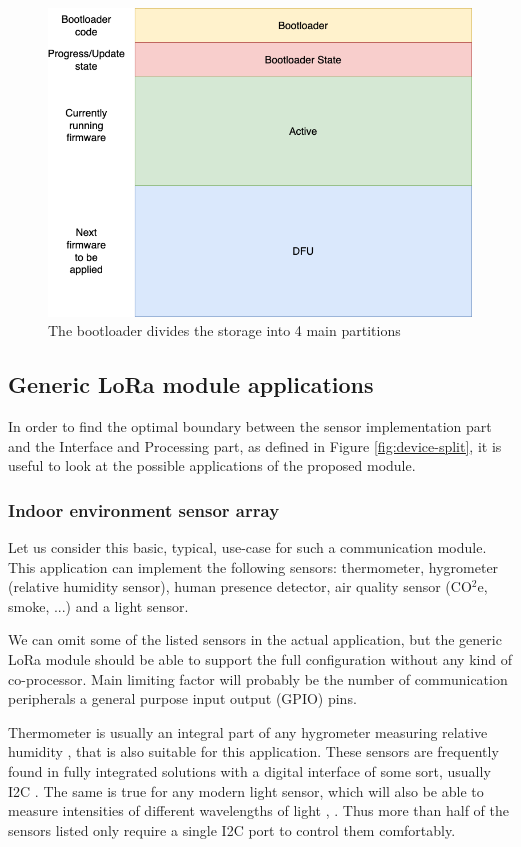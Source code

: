 \begin{figure}
    \includegraphics[width=.6\textwidth]{fig/bootloader_flash.png}
    \caption{\label{fig:bootloader-flash}The bootloader divides the storage into 4 main partitions}
\end{figure}

\subsection{\label{section:application-case-studies}Generic LoRa module applications}
In order to find the optimal boundary between the sensor implementation part and the Interface and Processing part, as defined in Figure \ref{fig:device-split}, it is useful to look at the possible applications of the proposed module.

\subsubsection{Indoor environment sensor array}
Let us consider this basic, typical, use-case for such a communication module. This application can implement the following sensors: thermometer, hygrometer (relative humidity sensor), human presence detector, air quality sensor (CO$^2$e, smoke, ...) and a light sensor.

We can omit some of the listed sensors in the actual application, but the generic LoRa module should be able to support the full configuration without any kind of co-processor. Main limiting factor will probably be the number of communication peripherals a general purpose input output (GPIO) pins.

Thermometer is usually an integral part of any hygrometer measuring relative humidity \cite{webster_humidity_1998}, that is also suitable for this application. These sensors are frequently found in fully integrated solutions with a digital interface of some sort, usually I2C \cite{bosch_sensortec_gmbh_bst-bme280-ds002pdf_2024}. The same is true for any modern light sensor, which will also be able to measure intensities of different wavelengths of light \cite{stmicroelectronics_ambient_2024}, \cite{texas_instruments_inc_light_2024}. Thus more than half of the sensors listed only require a single I2C port to control them comfortably.

